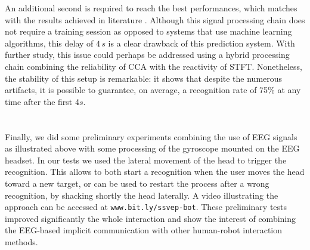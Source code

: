 \documentclass[smallextended]{svjour3}
\begin{document}
An additional second is required to reach the best performances, which matches with the results achieved in literature \cite{car,SSVEPfiability,jian2014improving,paper4}. 
Although this signal processing chain does not require a training session as opposed to systems that use machine learning algorithms, this delay of $4\,s$ is a clear drawback of this prediction system. 
With further study, this issue could perhaps be addressed using a hybrid processing chain combining the reliability of CCA with the reactivity of STFT.
Nonetheless, the stability of this setup is remarkable: it shows that despite the numerous artifacts, it is possible to guarantee, on average, a recognition rate of 75\% at any time after the first 4$s$. \\
\\
\\
Finally, we did some preliminary experiments combining the use of EEG signals as illustrated above with some processing of the gyroscope mounted on the EEG headset. In our tests we used the lateral movement of the head to trigger the recognition. This allows to both start a recognition when the user moves the head toward a new target, or can be used to restart the process after a wrong recognition, by shacking shortly the head laterally. A video illustrating the approach can be accessed at \verb"www.bit.ly/ssvep-bot". These preliminary tests improved significantly the whole interaction and show the interest of combining the EEG-based implicit communication with other human-robot interaction methods.
\end{document}
